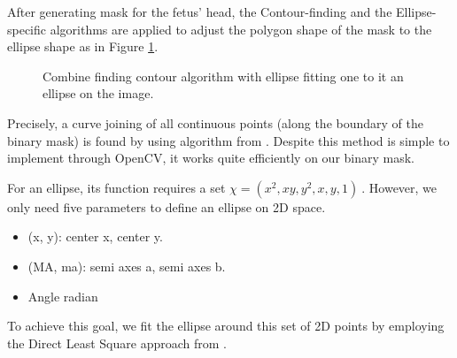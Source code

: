 	After generating mask for the fetus' head, the Contour-finding and the Ellipse-specific algorithms are applied to adjust the polygon shape of the mask to the ellipse shape as in Figure \ref{fig:post_process}.
	
	\begin{figure}[H]
		\centering
		\hfill %
		\hfill %
		\caption{Combine finding contour algorithm with ellipse fitting one to  it an ellipse on the image.}
		\label{fig:post_process}
	\end{figure}

	Precisely, a curve joining of all continuous points (along the boundary of the binary mask) is found by using algorithm from \cite{findContours}. Despite this method is simple to implement through OpenCV, it works quite efficiently on our binary mask.
	
	
	For an ellipse, its function requires a set $ \chi = (x^2, xy, y^2, x, y, 1)\ $. However, we only need five parameters to define an ellipse on 2D space. 
	
	\begin{itemize}
		\item (x, y): center x, center y.
		\item (MA, ma): semi axes a, semi axes b.
		\item Angle radian
	\end{itemize}
	
	To achieve this goal, we fit the ellipse around this set of 2D points by employing the Direct Least Square approach from \cite{direct_ellipse}.
	
